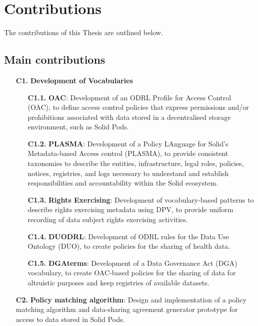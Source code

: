 \section{Contributions}
\label{sec:contributions}

The contributions of this Thesis are outlined below.

\subsection{Main contributions}
\label{sec:contr_main}

\begin{enumerate}
    \item [\textbf{C1.}] \textbf{Development of Vocabularies}
    \begin{enumerate}
        \item [\textbf{C1.1.}] \textbf{OAC}: Development of an ODRL Profile for Access Control (OAC), to define access control policies that express permissions and/or prohibitions associated with data stored in a decentralised storage environment, such as Solid Pods.
        \item [\textbf{C1.2.}] \textbf{PLASMA}: Development of a Policy LAnguage for Solid’s Metadata-based Access control (PLASMA), to provide consistent taxonomies to describe the entities, infrastructure, legal roles, policies, notices, registries, and logs necessary to understand and establish responsibilities and accountability within the Solid ecosystem.
        \item [\textbf{C1.3.}] \textbf{Rights Exercising}: Development of vocabulary-based patterns to describe rights exercising metadata using DPV, to provide uniform recording of data subject rights exercising activities.
        \item [\textbf{C1.4.}] \textbf{DUODRL}: Development of ODRL rules for the Data Use Ontology (DUO), to create policies for the sharing of health data.
        \item [\textbf{C1.5.}] \textbf{DGAterms}: Development of a Data Governance Act (DGA) vocabulary, to create OAC-based policies for the sharing of data for altruistic purposes and keep registries of available datasets.
    \end{enumerate}
    \item [\textbf{C2.}] \textbf{Policy matching algorithm}: Design and implementation of a policy matching algorithm and data-sharing agreement generator prototype for access to data stored in Solid Pods.
\end{enumerate}

